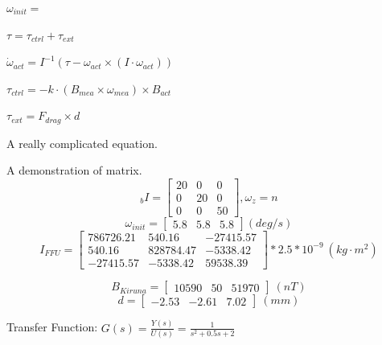\documentclass{mytemplate}
\begin{document}
$\omega_{init} = $

$\tau = \tau_{ctrl} + \tau_{ext}$

$\dot{\omega}_{act} = I^{-1}(\tau - \omega_{act} \times (I \cdot \omega_{act}))$

$\tau_{ctrl} = -k \cdot (B_{mea}\times\omega_{mea})\times B_{act}$

$\tau_{ext} = F_{drag} \times d$



A really complicated equation.

A demonstration of matrix.
\[
_{b}I =
  \begin{bmatrix}
    20 &  0 & 0  \\
    0  & 20 & 0  \\
    0  &  0 & 50
  \end{bmatrix}
  , {\omega}_z = n
\]
\[
\omega_{init} =
  \begin{bmatrix}
    5.8 & 5.8 & 5.8 
  \end{bmatrix} (deg/s)
\]
\[
I_{FFU} =
  \begin{bmatrix}
    786726.21 & 540.16 & -27415.57 \\
    540.16 & 828784.47 & -5338.42 \\
    -27415.57 & -5338.42 & 59538.39
  \end{bmatrix} *2.5*10^{-9}\ (kg \cdot m^2)
\]

\[
B_{Kiruna} =
  \begin{bmatrix}
    10590 & 50 & 51970
  \end{bmatrix} \ (nT)
\]
\[
d =
  \begin{bmatrix}
    -2.53 & -2.61 & 7.02
  \end{bmatrix} \ (mm)
\]


Transfer Function: $G(s)=\frac{Y(s)}{U(s)}=\frac{1}{s^2+0.5s+2}$
\end{document}
